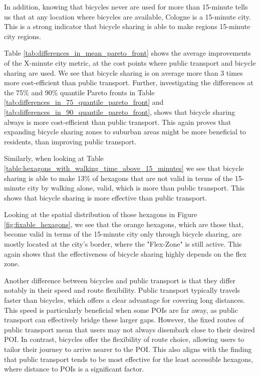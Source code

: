 In addition, knowing that bicycles never are used for more than 15-minute tells us that at any location where bicycles are available, Cologne is a 15-minute city.
This is a strong indicator that bicycle sharing is able to make regions 15-minute city regions.

Table \ref{tab:differences_in_mean_pareto_front} shows the average improvements of the X-minute city metric, at the cost points where public transport and bicycle sharing are used.
We see that bicycle sharing is on average more than 3 times more cost-efficient than public transport.
Further, investigating the differences at the 75\% and 90\% quantile Pareto fronts in Table \ref{tab:differences_in_75_quantile_pareto_front} and \ref{tab:differences_in_90_quantile_pareto_front}, shows that bicycle sharing always is more cost-efficient than public transport.
This again proves that expanding bicycle sharing zones to suburban areas might be more beneficial to residents, than improving public transport.

Similarly, when looking at Table \ref{table:hexagons_with_walking_time_above_15_minutes} we see that bicycle sharing is able to make 13\% of hexagons that are not valid in terms of the 15-minute city by walking alone, valid, which is more than public transport.
This shows that bicycle sharing is more effective than public transport.

Looking at the spatial distribution of those hexagons in Figure \ref{fig:fixable_hexagons}, we see that the orange hexagons, which are those that, become valid in terms of the 15-minute city only through bicycle sharing, are mostly located at the city's border, where the "Flex-Zone" is still active.
This again shows that the effectiveness of  bicycle sharing highly depends on the flex zone.



Another difference between bicycles and public transport is that they differ notably in their speed and route flexibility. 
Public transport typically travels faster than bicycles, which offers a clear advantage for covering long distances. 
This speed is particularly beneficial when some POIs are far away, as public transport can effectively bridge these larger gaps. 
However, the fixed routes of public transport mean that users may not always disembark close to their desired POI. 
In contrast, bicycles offer the flexibility of route choice, allowing users to tailor their journey to arrive nearer to the POI. 
This also aligns with the finding that public transport tends to be most effective for the least accessible hexagons, where distance to POIs is a significant factor.

